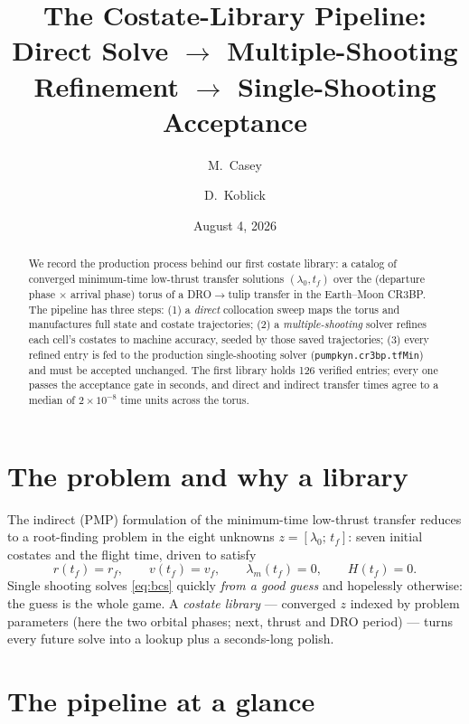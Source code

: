 \documentclass[11pt]{article}
\title{The Costate-Library Pipeline:\\
Direct Solve $\rightarrow$ Multiple-Shooting Refinement $\rightarrow$
Single-Shooting Acceptance}
\author{M.~Casey \and D.~Koblick}
\date{August 4, 2026}
\begin{document}
\maketitle

\begin{abstract}
We record the production process behind our first costate library: a catalog
of converged minimum-time low-thrust transfer solutions
$(\lambda_0, t_f)$ over the (departure phase $\times$ arrival phase) torus of
a DRO$\to$tulip transfer in the Earth--Moon CR3BP. The pipeline has three
steps: (1) a \emph{direct} collocation sweep maps the torus and manufactures
full state and costate trajectories; (2) a \emph{multiple-shooting} solver
refines each cell's costates to machine accuracy, seeded by those saved
trajectories; (3) every refined entry is fed to the production single-shooting
solver (\texttt{pumpkyn.cr3bp.tfMin}) and must be accepted unchanged. The
first library holds 126 verified entries; every one passes the acceptance
gate in seconds, and direct and indirect transfer times agree to a median of
$2\times10^{-8}$ time units across the torus.
\end{abstract}

\section{The problem and why a library}

The indirect (PMP) formulation of the minimum-time low-thrust transfer reduces
to a root-finding problem in the eight unknowns $z = [\lambda_0;\, t_f]$:
seven initial costates and the flight time, driven to satisfy
\begin{equation}
r(t_f) = r_f, \qquad v(t_f) = v_f, \qquad \lambda_m(t_f) = 0, \qquad
H(t_f) = 0 .
\label{eq:bcs}
\end{equation}
Single shooting solves \eqref{eq:bcs} quickly \emph{from a good guess} and
hopelessly otherwise: the guess is the whole game. A \emph{costate library} ---
converged $z$ indexed by problem parameters (here the two orbital phases;
next, thrust and DRO period) --- turns every future solve into a lookup plus a
seconds-long polish.


\section{The pipeline at a glance}
\end{document}
